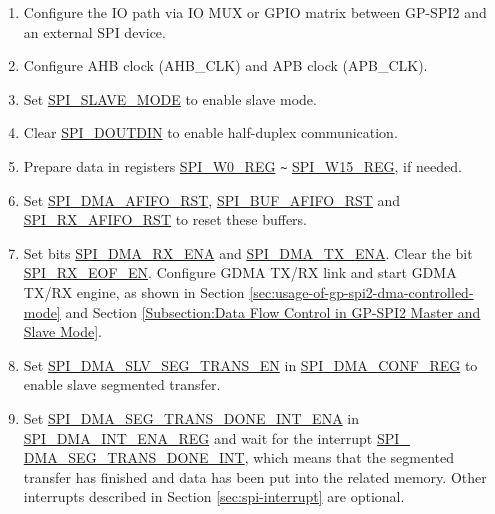 \documentclass[main\_\_EN.tex]{subfiles}
\begin{document}
\begin{enumerate}
   \item  Configure the IO path via IO MUX or GPIO matrix between GP-SPI2 and an external SPI device.

   \item Configure AHB clock (AHB\_CLK) and APB clock (APB\_CLK).

    \item Set \hyperref[fielddesc:SPISLAVEMODE]{SPI\_SLAVE\_MODE} to enable slave mode.

    \item Clear \hyperref[fielddesc:SPIDOUTDIN]{SPI\_DOUTDIN} to enable half-duplex communication.

    \item Prepare data in registers \hyperref[regdesc:SPIW0REG]{SPI\_W0\_REG} \verb+~+ \hyperref[regdesc:SPIW15REG]{SPI\_W15\_REG}, if needed.

    \item Set \hyperref[fielddesc:SPIDMAAFIFORST]{SPI\_DMA\_AFIFO\_RST}, \hyperref[fielddesc:SPIBUFAFIFORST]{SPI\_BUF\_AFIFO\_RST} and \hyperref[fielddesc:SPIRXAFIFORST]{SPI\_RX\_AFIFO\_RST} to reset these buffers.

    \item Set bits \hyperref[fielddesc:SPIDMARXENA]{SPI\_DMA\_RX\_ENA} and \hyperref[fielddesc:SPIDMATXENA]{SPI\_DMA\_TX\_ENA}. Clear the bit \hyperref[fielddesc:SPIRXEOFEN]{SPI\_RX\_EOF\_EN}. Configure GDMA TX/RX link and start GDMA TX/RX engine, as shown in Section \ref{sec:usage-of-gp-spi2-dma-controlled-mode} and Section \ref{Subsection:Data Flow Control in GP-SPI2 Master and Slave Mode}.

    \item Set \hyperref[fielddesc:SPIDMASLVSEGTRANSEN]{SPI\_DMA\_SLV\_SEG\_TRANS\_EN} in \hyperref[regdesc:SPIDMACONFREG]{SPI\_DMA\_CONF\_REG} to enable slave segmented transfer.

    \item Set \hyperref[fielddesc:SPIDMASEGTRANSDONEINTENA]{SPI\_DMA\_SEG\_TRANS\_DONE\_INT\_ENA} in \hyperref[regdesc:SPIDMAINTENAREG]{SPI\_DMA\_INT\_ENA\_REG} and wait for the interrupt \hyperref[int:SPIDMASEGTRANSDONEINT]{SPI\_\\DMA\_SEG\_TRANS\_DONE\_INT}, which means that the segmented transfer has finished and data has been put into the related memory. Other interrupts described in Section \ref{sec:spi-interrupt} are optional.
\end{enumerate}
\end{document}
